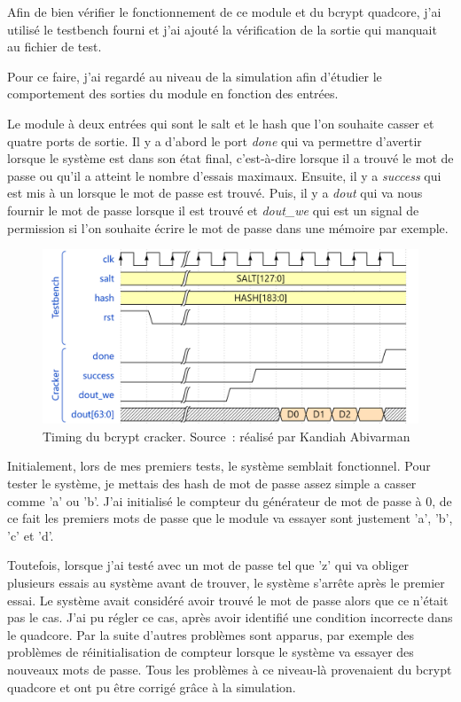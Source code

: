 Afin de bien vérifier le fonctionnement de ce module et du bcrypt quadcore, j'ai utilisé le testbench fourni et j'ai ajouté la vérification de la sortie qui manquait au fichier de test.

Pour ce faire, j'ai regardé au niveau de la simulation afin d'étudier le comportement des sorties du module en fonction des entrées.

Le module à deux entrées qui sont le salt et le hash que l'on souhaite casser et quatre ports de sortie.
Il y a d'abord le port \textit{done} qui va permettre d'avertir lorsque le système est dans son état final, c'est-à-dire lorsque il a trouvé le mot de passe ou qu'il a atteint le nombre d'essais maximaux.
Ensuite, il y a \textit{success} qui est mis à un lorsque le mot de passe est trouvé.
Puis, il y a \textit{dout} qui va nous fournir le mot de passe lorsque il est trouvé et \textit{dout\_we} qui est un signal de permission si l'on souhaite écrire le mot de passe dans une mémoire par exemple.

\newpage

\begin{figure}[tbph!]
	\centering
	\includegraphics[width=0.9\linewidth]{bcrypt_cracker_tb_timing}
	\caption[Timing du bcrypt cracker]{Timing du bcrypt cracker. Source : réalisé par Kandiah Abivarman}
	\label{fig:bcrypt_cracker_tb_timing}
\end{figure}

Initialement, lors de mes premiers tests, le système semblait fonctionnel. Pour tester le système, je mettais des hash de mot de passe assez simple a casser comme 'a' ou 'b'.
J'ai initialisé le compteur du générateur de mot de passe à 0, de ce fait les premiers mots de passe que le module va essayer sont justement 'a', 'b', 'c' et 'd'.

Toutefois, lorsque j'ai testé avec un mot de passe tel que 'z' qui va obliger plusieurs essais au système avant de trouver, le système s'arrête après le premier essai.
Le système avait considéré avoir trouvé le mot de passe alors que ce n'était pas le cas. J'ai pu régler ce cas, après avoir identifié une condition incorrecte dans le quadcore.
Par la suite d'autres problèmes sont apparus, par exemple des problèmes de réinitialisation de compteur lorsque le système va essayer des nouveaux mots de passe.
Tous les problèmes à ce niveau-là provenaient du bcrypt quadcore et ont pu être corrigé grâce à la simulation.
